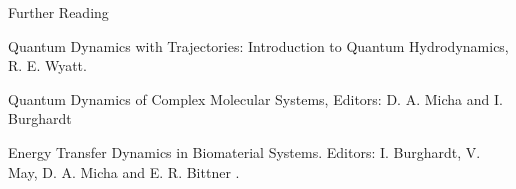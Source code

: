 \documentclass[slidestop,mathserif,compress,xcolor=svgnames]{beamer}
\begin{document}
\begin{frame}[allowframebreaks]
\begin{block}{\small Further Reading}
\begin{itemize}
{\item Quantum Dynamics with Trajectories: Introduction to Quantum Hydrodynamics, R. E. Wyatt.
\item Quantum Dynamics of Complex Molecular Systems, Editors: D. A. Micha and I. Burghardt
\item Energy Transfer Dynamics in Biomaterial Systems. Editors: I. Burghardt, V. May, D. A. Micha and E. R. Bittner .
}
\end{itemize}
\end{block}
\end{frame}
\end{document}
